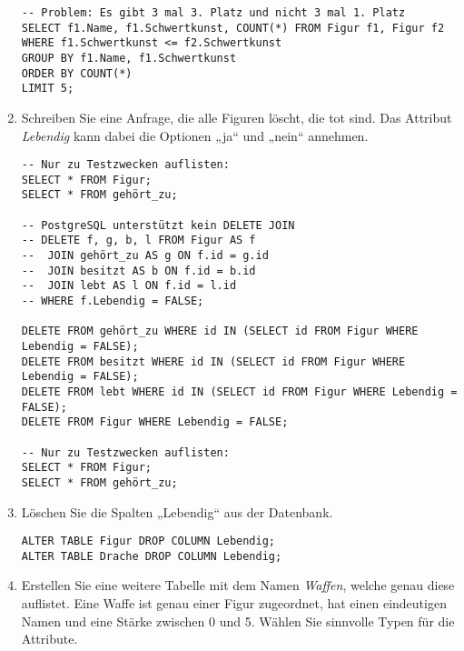 \documentclass{bschlangaul-aufgabe}
\begin{document}
\begin{enumerate}
\begin{bAntwort}
\begin{verbatim}
-- Problem: Es gibt 3 mal 3. Platz und nicht 3 mal 1. Platz
SELECT f1.Name, f1.Schwertkunst, COUNT(*) FROM Figur f1, Figur f2
WHERE f1.Schwertkunst <= f2.Schwertkunst
GROUP BY f1.Name, f1.Schwertkunst
ORDER BY COUNT(*)
LIMIT 5;
\end{verbatim}
\end{bAntwort}

%

\item Schreiben Sie eine Anfrage, die alle Figuren löscht, die tot sind.
Das Attribut \emph{Lebendig} kann dabei die Optionen „ja“ und „nein“
annehmen.

\begin{bAntwort}
\begin{verbatim}
-- Nur zu Testzwecken auflisten:
SELECT * FROM Figur;
SELECT * FROM gehört_zu;

-- PostgreSQL unterstützt kein DELETE JOIN
-- DELETE f, g, b, l FROM Figur AS f
--  JOIN gehört_zu AS g ON f.id = g.id
--  JOIN besitzt AS b ON f.id = b.id
--  JOIN lebt AS l ON f.id = l.id
-- WHERE f.Lebendig = FALSE;

DELETE FROM gehört_zu WHERE id IN (SELECT id FROM Figur WHERE Lebendig = FALSE);
DELETE FROM besitzt WHERE id IN (SELECT id FROM Figur WHERE Lebendig = FALSE);
DELETE FROM lebt WHERE id IN (SELECT id FROM Figur WHERE Lebendig = FALSE);
DELETE FROM Figur WHERE Lebendig = FALSE;

-- Nur zu Testzwecken auflisten:
SELECT * FROM Figur;
SELECT * FROM gehört_zu;
\end{verbatim}
\end{bAntwort}

%

\item Löschen Sie die Spalten „Lebendig“ aus der Datenbank.

\begin{bAntwort}
\begin{verbatim}
ALTER TABLE Figur DROP COLUMN Lebendig;
ALTER TABLE Drache DROP COLUMN Lebendig;
\end{verbatim}
\end{bAntwort}

%

\item Erstellen Sie eine weitere Tabelle mit dem Namen \emph{Waffen},
welche genau diese auflistet. Eine Waffe ist genau einer Figur
zugeordnet, hat einen eindeutigen Namen und eine Stärke zwischen 0 und
5. Wählen Sie sinnvolle Typen für die Attribute.


\end{enumerate}
\end{document}
